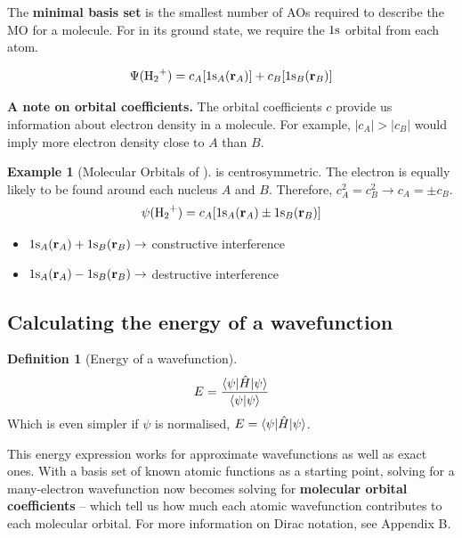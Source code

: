 \documentclass[a4paper]{tufte-handout}
\theoremstyle{definition}
\newtheorem{definition}{Definition}
\newtheorem{example}{Example}
\begin{document}
The \textbf{minimal basis set} is the smallest number of AOs required to describe the MO for a molecule. For 
in its ground state, we require the $1\ce{s}$ orbital from each  atom.

\begin{equation}
  \Psi(\ce{H2+}) = c_A [1\ce{s_}_A (\mathbf{r}_A)]+ c_B [1\ce{s_}_B (\mathbf{r}_B)]
\end{equation}

\textbf{A note on orbital coefficients.} The orbital coefficients $c$ provide us information
about electron density in a molecule. For example, $|c_A| > |c_B|$ would imply more electron density close
to $A$ than $B$.

\begin{example}[Molecular Orbitals of ]
   is centrosymmetric. The electron is equally likely to be found around each nucleus $A$ and $B$. 
  Therefore, $c_A^2 = c_B^2 \rightarrow c_A = \pm c_B$.
  \begin{equation}
    \psi(\ce{H2+}) = c_A[1\ce{s_}_A (\mathbf{r}_A) \pm 1\ce{s_}_B (\mathbf{r}_B)]
  \end{equation}

\begin{itemize}
  \item $1\ce{s_}_A (\mathbf{r}_A) + 1\ce{s_}_B (\mathbf{r}_B) \rightarrow$ constructive interference
  \item $1\ce{s_}_A (\mathbf{r}_A) - 1\ce{s_}_B (\mathbf{r}_B) \rightarrow$ destructive interference
\end{itemize}

\end{example}

\subsection{Calculating the energy of a wavefunction}

\begin{definition}[Energy of a wavefunction]
\begin{equation}
  E = \frac{\braket{\psi{|\hat{H}|\psi}}}{\braket{\psi|\psi}}
\end{equation}
Which is even simpler if $\psi$ is normalised, $E = \braket{\psi{|\hat{H}|\psi}}$.
\end{definition}

This energy expression works for approximate wavefunctions as well as exact ones. With a 
basis set of known atomic functions as a starting point, solving for a many-electron wavefunction
now becomes 
solving for \textbf{molecular orbital coefficients} -- which tell us how much each atomic
wavefunction contributes to each molecular orbital.
For more information on Dirac notation, see Appendix B.
\end{document}
